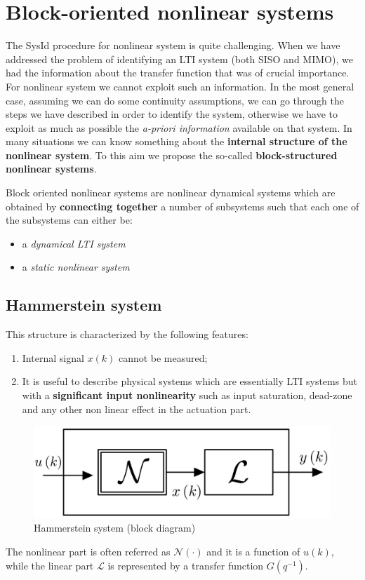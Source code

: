 \section{Block-oriented nonlinear systems}
The SysId procedure for nonlinear system is quite challenging. When we have addressed the problem of identifying an LTI system (both SISO and MIMO), we had the information about the transfer function that was of crucial importance. For nonlinear system we cannot exploit such an information. In the most general case, assuming we can do some continuity assumptions, we can go through the steps we have described in order to identify the system, otherwise we have to exploit as much as possible the \textit{a-priori information} available on that system. In many situations we can know something about the \textbf{internal structure of the nonlinear system}. To this aim we propose the so-called \textbf{block-structured nonlinear systems}.

\begin{definition} Block oriented nonlinear systems are nonlinear dynamical systems which are obtained by \textbf{connecting together} a number of subsystems such that each one of the subsystems can either be:
\begin{itemize}
    \itemsep-0.3em
    \item a \textit{dynamical LTI system}
    \item a \textit{static nonlinear system}
\end{itemize}

\subsection{Hammerstein system}

This structure is characterized by the following features:
\begin{enumerate}
    \itemsep-0.3em
    \item Internal signal $x(k)$ cannot be measured;
    \item It is useful to describe physical systems which are essentially LTI systems but with a \textbf{significant input nonlinearity} such as input saturation, dead-zone and any other non linear effect in the actuation part.
\end{enumerate}
\begin{figure}[h]
    \centering
    \includegraphics[scale=0.15]{img/hammer.jpeg}
    \caption{Hammerstein system (block diagram)}
\end{figure}
The nonlinear part is often referred as $\mathcal{N}(\cdot)$ and it is a function of $u(k)$, while the linear part $\mathcal{L}$ is represented by a transfer function $G(q^{-1})$.
    
\end{definition}

